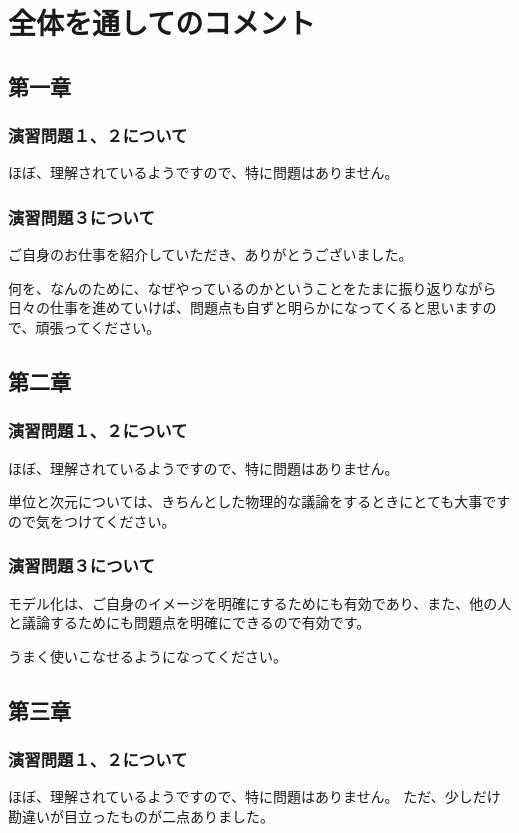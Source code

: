 \documentclass[uplatex,dvipdfmx,a4paper,11pt]{jsreport}
\begin{document}
\section*{全体を通してのコメント}
\subsection*{第一章}
\subsubsection*{演習問題１、２について}
ほぼ、理解されているようですので、特に問題はありません。

\subsubsection*{演習問題３について}

ご自身のお仕事を紹介していただき、ありがとうございました。

何を、なんのために、なぜやっているのかということをたまに振り返りながら日々の仕事を進めていけば、問題点も自ずと明らかになってくると思いますので、頑張ってください。


\subsection*{第二章}
\subsubsection*{演習問題１、２について}
ほぼ、理解されているようですので、特に問題はありません。

単位と次元については、きちんとした物理的な議論をするときにとても大事ですので気をつけてください。

\subsubsection*{演習問題３について}

モデル化は、ご自身のイメージを明確にするためにも有効であり、また、他の人と議論するためにも問題点を明確にできるので有効です。

うまく使いこなせるようになってください。

\subsection*{第三章}
\subsubsection*{演習問題１、２について}
ほぼ、理解されているようですので、特に問題はありません。
ただ、少しだけ勘違いが目立ったものが二点ありました。
\end{document}
